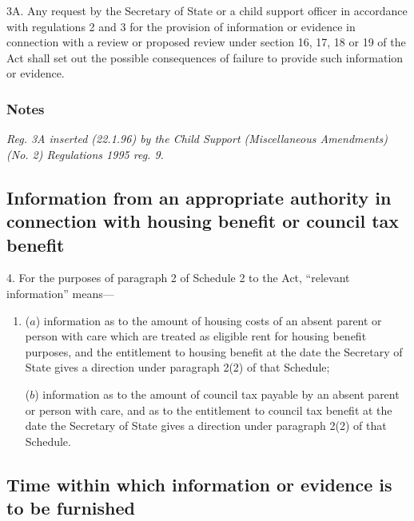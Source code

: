 \documentclass[a4paper]{article}
\newcommand\amendment[1]{\subsubsection*{Notes}{\itshape\frenchspacing\footnotesize #1 \par}}
\begin{document}
3A.  Any request by the Secretary of State or a child support officer in accordance with regulations 2 and 3 for the provision of information or evidence in connection with a review or proposed review under section 16, 17, 18 or 19 of the Act shall set out the possible consequences of failure to provide such information or evidence.

\amendment{
Reg. 3A inserted (22.1.96) by the Child Support (Miscellaneous Amendments) (No. 2) Regulations 1995 reg. 9.
}

\subsection[4. Information from an appropriate authority in connection with housing benefit or council tax benefit]{Information from an appropriate authority in connection with housing benefit or council tax benefit}

4.  For the purposes of paragraph 2 of Schedule 2 to the Act, “relevant information” means—
\begin{enumerate}\item[]
($a$) information as to the amount of housing costs of an absent parent or person with care which are treated as eligible rent for housing benefit purposes, and the entitlement to housing benefit at the date the Secretary of State gives a direction under paragraph 2(2) of that Schedule;

($b$) information as to the amount of council tax payable by an absent parent or person with care, and as to the entitlement to council tax benefit at the date the Secretary of State gives a direction under paragraph 2(2) of that Schedule.
\end{enumerate}

%

\subsection[5. Time within which information or evidence is to be furnished]{Time within which information or evidence is to be furnished}
\end{document}
